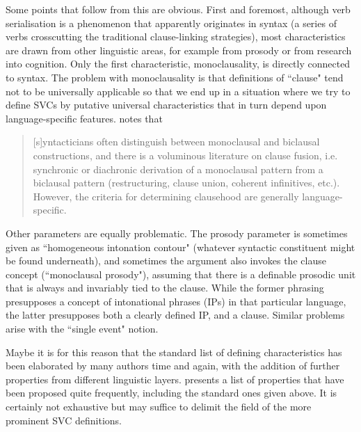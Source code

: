 Some points that follow from this are obvious. First and foremost, although verb serialisation is a phenomenon that apparently originates in syntax (a series of verbs crosscutting the traditional clause-linking strategies), most characteristics are drawn from other linguistic areas, for example from prosody or from research into cognition. Only the first characteristic, monoclausality, is directly connected to syntax. The problem with monoclausality is that definitions of ``clause" tend not to be universally applicable so that we end up in a situation where we try to define SVCs by putative universal characteristics that in turn depend upon language-specific features. \citet[298]{haspelmath2016serial} notes that \begin{quote}[s]yntacticians often distinguish between monoclausal and biclausal constructions, and there is a voluminous literature on clause fusion, i.e. synchronic or diachronic derivation of a monoclausal pattern from a biclausal pattern
(restructuring, clause union, coherent infinitives, etc.). However, the criteria for determining clausehood are generally language-specific.\end{quote}

Other parameters are equally problematic. The prosody parameter is sometimes given as ``homogeneous intonation contour" (whatever syntactic constit\-u\-ent might be found underneath), and sometimes the argument also invokes the clause concept (``monoclausal prosody"), assuming that there is a definable prosodic unit that is always and invariably tied to the clause. While the former phrasing presupposes a concept of intonational phrases (IPs) in that particular language, the latter presupposes both a clearly defined IP, and a clause. Similar problems arise with the ``single event" notion.

Maybe it is for this reason that the standard list of defining characteristics has been elaborated by many authors time and again, with the addition of further properties from different linguistic layers.  presents a list of properties that have been proposed quite frequently, including the standard ones given above. It is certainly not exhaustive but may suffice to delimit the field of the more prominent SVC definitions.

